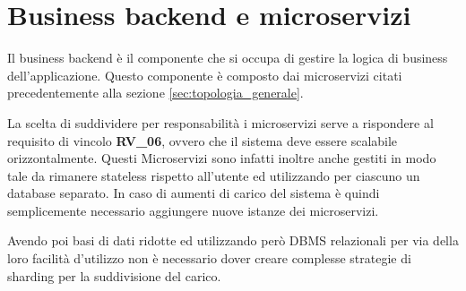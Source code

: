 \section{Business backend e microservizi}

Il business backend è il componente che si occupa di gestire la logica di business dell'applicazione. Questo componente è composto dai microservizi citati precedentemente alla sezione \ref{sec:topologia_generale}.

La scelta di suddividere per responsabilità i microservizi serve a rispondere al requisito di vincolo \textbf{RV\_06}, ovvero che il sistema deve essere scalabile orizzontalmente. Questi Microservizi sono infatti inoltre anche gestiti in modo tale da rimanere stateless rispetto all'utente ed utilizzando per ciascuno un database separato. In caso di aumenti di carico del sistema è quindi semplicemente necessario aggiungere nuove istanze dei microservizi.

Avendo poi basi di dati ridotte ed utilizzando però DBMS relazionali per via della loro facilità d'utilizzo non è necessario dover creare complesse strategie di sharding per la suddivisione del carico.

